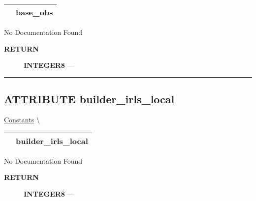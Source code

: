 {\renewcommand{\arraystretch}{1.5}
\begin{tabularx}{\textwidth}{|>{\raggedright\arraybackslash}l|X|}
\hline
\hspace{0pt}\mytexttt{\color{red} } & \textbf{base\_obs} \\
\hline
\end{tabularx}
}

\par





No Documentation Found








\par
\begin{description}
\item [\colorbox{tagtype}{\color{white} \textbf{\textsf{RETURN}}}] \textbf{INTEGER8} --- 
\end{description}




\rule{\linewidth}{0.5pt}
\subsection*{\textsf{\colorbox{headtoc}{\color{white} ATTRIBUTE}
builder\_irls\_local}}

\hypertarget{ecldoc:constants.builder_irls_local}{}
\hspace{0pt} \hyperlink{ecldoc:Constants}{Constants} \textbackslash 

{\renewcommand{\arraystretch}{1.5}
\begin{tabularx}{\textwidth}{|>{\raggedright\arraybackslash}l|X|}
\hline
\hspace{0pt}\mytexttt{\color{red} } & \textbf{builder\_irls\_local} \\
\hline
\end{tabularx}
}

\par





No Documentation Found








\par
\begin{description}
\item [\colorbox{tagtype}{\color{white} \textbf{\textsf{RETURN}}}] \textbf{INTEGER8} --- 
\end{description}




